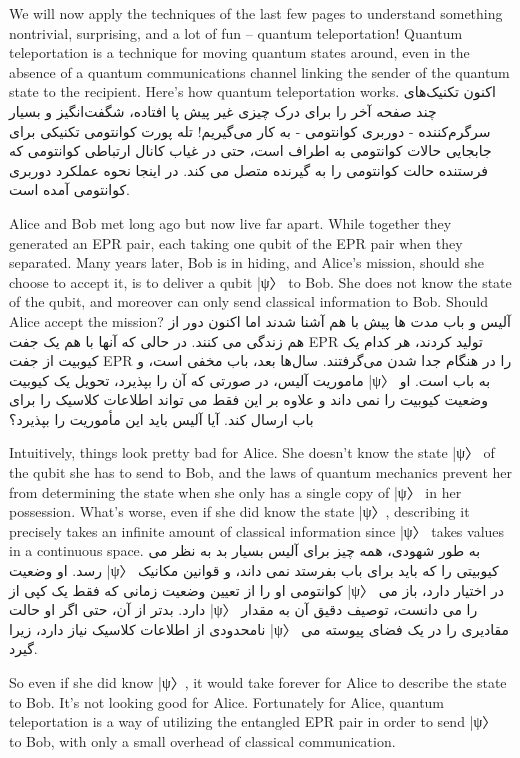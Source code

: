 \documentclass{book}
\begin{document}
We will now apply the techniques of the last few pages to understand something nontrivial, surprising, and a lot of fun – quantum teleportation! Quantum teleportation is a technique for moving quantum states around, even in the absence of a quantum communications channel linking the sender of the quantum state to the recipient. Here’s how quantum teleportation works.
اکنون تکنیک‌های چند صفحه آخر را برای درک چیزی غیر پیش پا افتاده، شگفت‌انگیز و بسیار سرگرم‌کننده - دوربری کوانتومی - به کار می‌گیریم! تله پورت کوانتومی تکنیکی برای جابجایی حالات کوانتومی به اطراف است، حتی در غیاب کانال ارتباطی کوانتومی که فرستنده حالت کوانتومی را به گیرنده متصل می کند. در اینجا نحوه عملکرد دوربری کوانتومی آمده است.


 Alice and Bob met long ago but now live far apart. While together they generated an EPR pair, each taking one qubit of the EPR pair when they separated. Many years later, Bob is in hiding, and Alice’s mission, should she choose to accept it, is to deliver a qubit |ψ〉 to Bob. She does not know the state of the qubit, and moreover can only send classical information to Bob. Should Alice accept the mission?
 آلیس و باب مدت ها پیش با هم آشنا شدند اما اکنون دور از هم زندگی می کنند. در حالی که آنها با هم یک جفت EPR تولید کردند، هر کدام یک کیوبیت از جفت EPR را در هنگام جدا شدن می‌گرفتند. سال‌ها بعد، باب مخفی است، و ماموریت آلیس، در صورتی که آن را بپذیرد، تحویل یک کیوبیت |ψ〉 به باب است. او وضعیت کیوبیت را نمی داند و علاوه بر این فقط می تواند اطلاعات کلاسیک را برای باب ارسال کند. آیا آلیس باید این مأموریت را بپذیرد؟


Intuitively, things look pretty bad for Alice. She doesn’t know the state |ψ〉 of the qubit she has to send to Bob, and the laws of quantum mechanics prevent her from determining the state when she only has a single copy of |ψ〉 in her possession. What’s worse, even if she did know the state |ψ〉, describing it precisely takes an infinite amount of classical information since |ψ〉 takes values in a continuous space.
به طور شهودی، همه چیز برای آلیس بسیار بد به نظر می رسد. او وضعیت |ψ〉 کیوبیتی را که باید برای باب بفرستد نمی داند، و قوانین مکانیک کوانتومی او را از تعیین وضعیت زمانی که فقط یک کپی از |ψ〉 در اختیار دارد، باز می دارد. بدتر از آن، حتی اگر او حالت |ψ〉 را می دانست، توصیف دقیق آن به مقدار نامحدودی از اطلاعات کلاسیک نیاز دارد، زیرا |ψ〉 مقادیری را در یک فضای پیوسته می گیرد.

 So even if she did know |ψ〉, it would take forever for Alice to describe the state to Bob. It’s not looking
good for Alice. Fortunately for Alice, quantum teleportation is a way of utilizing the entangled EPR pair in order to send |ψ〉 to Bob, with only a small overhead of classical communication.
\end{document}

